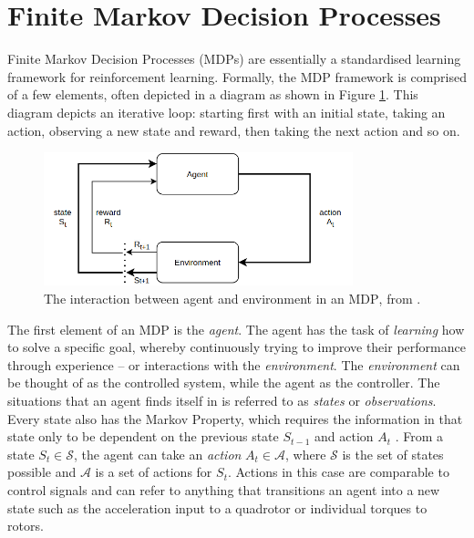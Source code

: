 \section{Finite Markov Decision Processes}
\label{sec:MDPs}

Finite Markov Decision Processes (MDPs) are essentially a standardised learning framework for reinforcement learning. Formally, the MDP framework is comprised of a few elements, often depicted in a diagram as shown in Figure \ref{fig:2_1_simpleMDP}. This diagram depicts an iterative loop: starting first with an initial state, taking an action, observing a new state and reward, then taking the next action and so on.
\begin{figure}[hbt]
    \centering
    \includegraphics[width=0.8\textwidth]{figures/2_/2_1_simpleEnv2.png}
    \caption{The interaction between agent and environment in an MDP$ $, from \cite{suttonAndBartoBook}.}
    \label{fig:2_1_simpleMDP}
\end{figure}

The first element of an MDP is the \textit{agent}. The agent has the task of \textit{learning} how to solve a specific goal, whereby continuously trying to improve their performance through experience -- or interactions with the \textit{environment}. The \textit{environment} can be thought of as the controlled system, while the agent as the controller.
The situations that an agent finds itself in is referred to as \textit{states} or \textit{observations}. Every state also has the Markov Property, which requires the information in that state only to be dependent on the previous state $S_{t-1}$ and action $A_t$ \cite{suttonAndBartoBook}. 
From a state $S_{t} \in \mathcal{S}$, the agent can take an \textit{action} $A_{t}\in \mathcal{A}$, where $\mathcal{S}$ is the set of states possible and $\mathcal{A}$ is a set of actions for $S_{t}$.
Actions in this case are comparable to control signals and can refer to anything that transitions an agent into a new state such as the acceleration input to a quadrotor or individual torques to rotors. 

